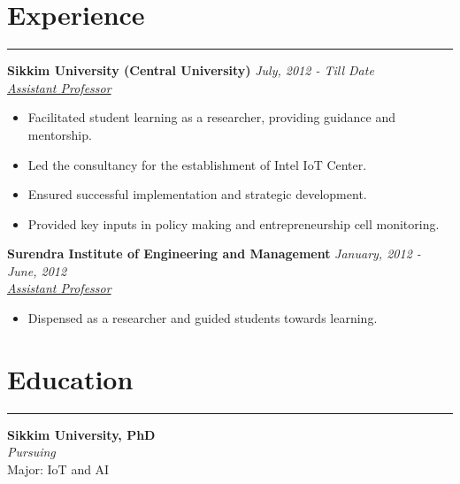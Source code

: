 \documentclass[10pt, a4paper]{article}
\begin{document}
\section*{Experience}
\vspace*{-2.5mm}
\hrule 
\vspace*{2mm}
  \noindent\textbf{Sikkim University (Central University)} \hfill \textit{July, 2012 - Till Date}\\
  \textit{\underline{Assistant Professor}} \\
  \vspace*{-4mm}
    \begin{itemize}[leftmargin=*]
	\item Facilitated student learning as a researcher, providing guidance and mentorship.
	    \vspace*{-2.5mm}
	\item Led the consultancy for the establishment of Intel IoT Center. 
	\vspace*{-2.5mm}
	\item Ensured successful implementation and strategic development.
	    \vspace*{-2.5mm}
	\item Provided key inputs in policy making and entrepreneurship cell monitoring.  
	\end{itemize}

  \noindent\textbf{Surendra Institute of Engineering and Management} \hfill \textit{January, 2012 - June, 2012}\\
  \textit{\underline{Assistant Professor}} \\
\vspace*{-4mm}
\begin{itemize}[leftmargin=*]
	\item Dispensed as a researcher and guided students towards learning.

\end{itemize}


	\vspace*{-5mm}	

    
    \section*{Education}
    \vspace*{-2.5mm}
    \hrule 
    \vspace*{2mm}
 
\noindent     \textbf{Sikkim University, PhD}\\
 \textit{Pursuing}\\
 Major: IoT and AI\\
    
\end{document}
